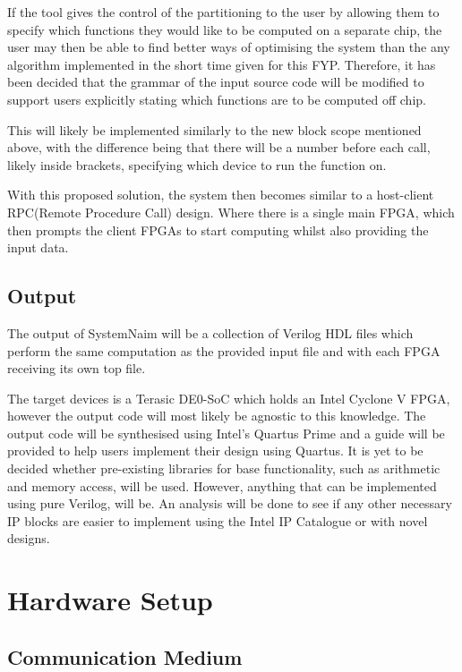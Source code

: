 If the tool gives the control of the partitioning to the user by allowing them to specify which functions they would like to be computed on a separate chip, the user may then be able to find better ways of optimising the system than the any algorithm implemented in the short time given for this FYP. Therefore, it has been decided that the grammar of the input source code will be modified to support users explicitly stating which functions are to be computed off chip.

This will likely be implemented similarly to the new block scope mentioned above, with the difference being that there will be a number before each call, likely inside brackets, specifying which device to run the function on.

With this proposed solution, the system then becomes similar to a host-client RPC(Remote Procedure Call) design. Where there is a single main FPGA, which then prompts the client FPGAs to start computing whilst also providing the input data.

\subsection{Output}

The output of SystemNaim will be a collection of Verilog HDL files which perform the same computation as the provided input file and with each FPGA receiving its own top file.

The target devices is a Terasic DE0-SoC which holds an Intel Cyclone V FPGA, however the output code will most likely be agnostic to this knowledge. The output code will be synthesised using Intel's Quartus Prime and a guide will be provided to help users implement their design using Quartus. It is yet to be decided whether pre-existing libraries for base functionality, such as arithmetic and memory access, will be used. However, anything that can be implemented using pure Verilog, will be. An analysis will be done to see if any other necessary IP blocks are easier to implement using the Intel IP Catalogue or with novel designs.

\section{Hardware Setup}

\subsection{Communication Medium}

